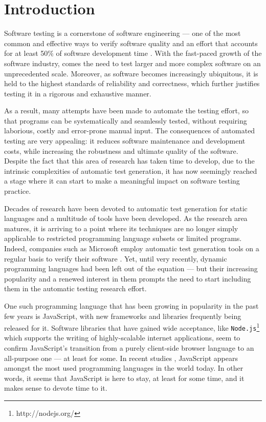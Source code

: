 \documentclass[a4paper,11pt,titlepage]{report}
\begin{document}
\tableofcontents

\chapter{Introduction}

Software testing is a cornerstone of software engineering --- one of the most common and effective ways to verify software quality and an effort that accounts for at least 50\% of software development time \cite{tahbildar2automated}. With the fast-paced growth of the software industry, comes the need to test larger and more complex software on an unprecedented scale. Moreover, as software becomes increasingly ubiquitous, it is held to the highest standards of reliability and correctness, which further justifies testing it in a rigorous and exhaustive manner.

As a result, many attempts have been made to automate the testing effort, so that programs can be systematically and seamlessly tested, without requiring laborious, costly and error-prone manual input. The consequences of automated testing are very appealing: it reduces software maintenance and development costs, while increasing the robustness and ultimate quality of the software. Despite the fact that this area of research has taken time to develop, due to the intrinsic complexities of automatic test generation, it has now seemingly reached a stage where it can start to make a meaningful impact on software testing practice.

Decades of research have been devoted to automatic test generation for static languages and a multitude of tools have been developed. As the research area matures, it is arriving to a point where its techniques are no longer simply applicable to restricted programming language subsets or limited programs. Indeed, companies such as Microsoft employ automatic test generation tools on a regular basis to verify their software \cite{păsăreanu2009survey}. Yet, until very recently, dynamic programming languages had been left out of the equation --- but their increasing popularity and a renewed interest in them prompts the need to start including them in the automatic testing research effort.

One such programming language that has been growing in popularity in the past few years is JavaScript, with new frameworks and libraries frequently being released for it. Software libraries that have gained wide acceptance, like \texttt{Node.js}\footnote{http://nodejs.org/} which supports the writing of highly-scalable internet applications, seem to confirm JavaScript's transition from a purely client-side browser language to an all-purpose one --- at least for some. In recent studies \cite{website:langpop}, JavaScript appears amongst the most used programming languages in the world today. In other words, it seems that JavaScript is here to stay, at least for some time, and it makes sense to devote time to it.
\end{document}
